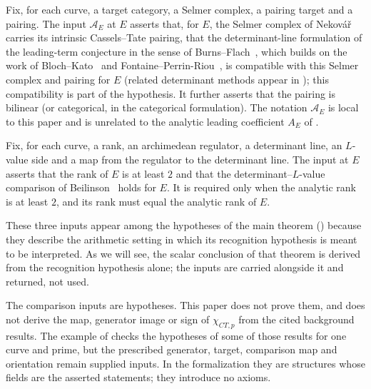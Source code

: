 \documentclass[11pt]{article}
\theoremstyle{definition}
\newcommand{\chiCTp}{\chi_{CT,p}}                       \newcommand{\AofE}{\mathcal{A}_E}                        \newcommand{\etap}{\eta_p}                              \newcommand{\RefStable}{\mathbf{RefStable\,AOR}}
\begin{document}
\begin{definition}\label{def:closure:a-e-import}
Fix, for each curve, a target category, a Selmer complex, a pairing
target and a pairing.  The input $\AofE$ at $E$ asserts that, for $E$,
the Selmer complex of Nekov\'a\v{r}~\citep{Nekovar2006} carries its
intrinsic Cassels--Tate pairing, that the determinant-line formulation of
the leading-term conjecture in the sense of
Burns--Flach~\citep{BurnsFlach2001}, which builds on the work of
Bloch--Kato~\citep{BlochKato1990} and
Fontaine--Perrin-Riou~\citep{FontainePerrinRiou1994}, is compatible with
this Selmer complex and pairing for $E$ (related determinant methods
appear in \citep{BurnsMaciasCastilloSeo2024,MaciasCastilloSano2026}); this
compatibility is part of the hypothesis.  It further asserts that the pairing is bilinear (or categorical, in the
categorical formulation).  The notation $\AofE$ is local to this paper and
is unrelated to the analytic leading coefficient $A_E$ of
\citet{TsiokosBSDApparatus2026}.
\end{definition}

\begin{definition}\label{def:closure:beilinson-import}
Fix, for each curve, a rank, an archimedean regulator, a determinant line,
an $L$-value side and a map from the regulator to the determinant line.
The input at $E$ asserts that the rank of $E$ is at least $2$ and that the
determinant--$L$-value comparison of Beilinson~\citep{Beilinson1985} holds
for $E$.  It is required only when the analytic rank is at least $2$, and
its rank must equal the analytic rank of $E$.
\end{definition}

These three inputs appear among the hypotheses of the main theorem
() because they describe the
arithmetic setting in which its recognition hypothesis is meant to be
interpreted.  As we will see, the scalar conclusion of that theorem is
derived from the recognition hypothesis alone; the inputs are carried
alongside it and returned, not used.

\begin{nonclaim}\label{nonclaim:closure:imports-not-derived}
The comparison inputs are hypotheses.  This paper does not prove them,
and does not derive the map, generator image or sign of $\chiCTp$ from
the cited background results.  The example of  checks
the hypotheses of some of those results for one curve and prime, but the
prescribed generator, target, comparison map and orientation remain
supplied inputs.  In the formalization they are
structures whose fields are the asserted statements; they introduce no
axioms.
\end{nonclaim}
\end{document}
